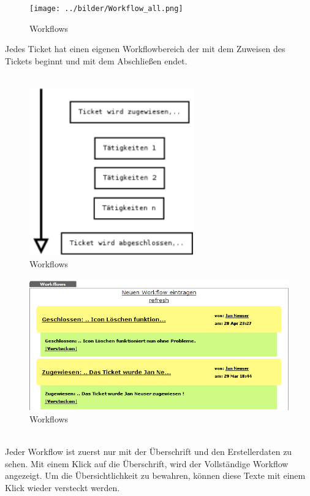 \begin{figure}[h!]
\begin{center}
   \texttt{[image: ../bilder/Workflow\_all.png]}
   \caption{Workflows}
   \label{Workflows}
\end{center}
\end{figure}
\newpage
Jedes Ticket hat einen eigenen Workflowbereich der mit dem Zuweisen des Tickets beginnt und mit dem Abschließen endet.\\
\\
\begin{figure}[h!]
\begin{center}
   \includegraphics[width=200pt]{../bilder/workflow_erz.png}
   \caption{Workflows}
   \label{Workflows}
\end{center}
\end{figure}
\begin{figure}[htbp!]
\begin{center}
   \includegraphics[width=400pt]{../bilder/workflow_auf.png}
   \caption{Workflows}
   \label{Workflows}
\end{center}
\end{figure}
\\
Jeder Workflow ist zuerst nur mit der Überschrift und den Erstellerdaten zu sehen. Mit einem Klick auf die Überschrift, wird der Vollständige Workflow angezeigt. Um die Übersichtlichkeit zu bewahren, können diese Texte mit einem Klick wieder versteckt werden.
 
